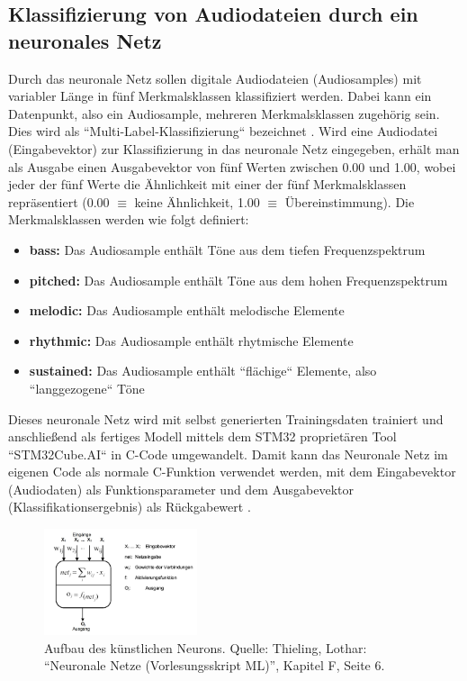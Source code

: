 \subsection{Klassifizierung von Audiodateien durch ein neuronales Netz}
\label{sec:classification-intro}
Durch das neuronale Netz sollen digitale Audiodateien (Audiosamples) mit variabler Länge in fünf Merkmalsklassen klassifiziert werden. Dabei kann ein Datenpunkt, also ein Audiosample, mehreren Merkmalsklassen zugehörig sein. Dies wird als ``Multi-Label-Klassifizierung`` bezeichnet \cite{multilabel-classification}. Wird eine Audiodatei (Eingabevektor) zur Klassifizierung in das neuronale Netz eingegeben, erhält man als Ausgabe einen Ausgabevektor von fünf Werten zwischen 0.00 und 1.00, wobei jeder der fünf Werte  die Ähnlichkeit mit einer der fünf Merkmalsklassen repräsentiert (0.00 $\equiv$ keine Ähnlichkeit, 1.00 $\equiv$ Übereinstimmung). Die Merkmalsklassen werden wie folgt definiert:
    \begin{itemize}
        \item \textbf{bass:} Das Audiosample enthält Töne aus dem tiefen Frequenzspektrum
       	\item \textbf{pitched:} Das Audiosample enthält Töne aus dem hohen Frequenzspektrum
        \item \textbf{melodic:} Das Audiosample enthält melodische Elemente
        \item \textbf{rhythmic:} Das Audiosample enthält rhytmische Elemente
        \item \textbf{sustained:} Das Audiosample enthält ``flächige`` Elemente, also ``langgezogene`` Töne
    \end{itemize}

Dieses neuronale Netz wird mit selbst generierten Trainingsdaten trainiert und anschließend als fertiges Modell mittels dem STM32 proprietären Tool ``STM32Cube.AI`` in C-Code umgewandelt. Damit kann das Neuronale Netz im eigenen Code als normale C-Funktion verwendet werden, mit dem Eingabevektor (Audiodaten) als Funktionsparameter und dem Ausgabevektor (Klassifikationsergebnis) als Rückgabewert \cite{stm32-cube-ai-documentation}.

\begin{figure}
    \centering
    \includegraphics[width=0.4\textwidth]{images/08_durchfuehrung/nn/neuron-aufbau.png}
    \caption{Aufbau des künstlichen Neurons. Quelle: Thieling, Lothar: “Neuronale Netze (Vorlesungsskript ML)”, Kapitel F, Seite 6.}
    \label{fig:img-aufbau-neuron}
\end{figure}

